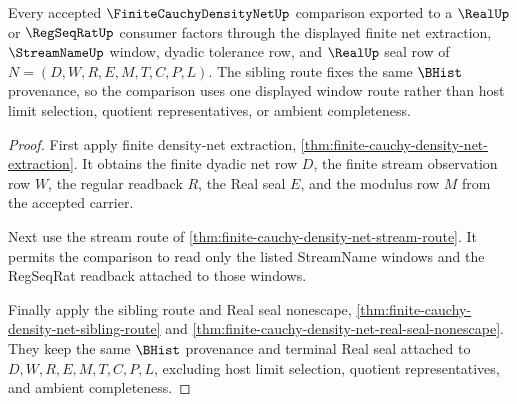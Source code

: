 \begin{theorem}
\label{thm:finite-cauchy-density-net-window-comparison}
Every accepted $\FiniteCauchyDensityNetUp$ comparison exported to a $\RealUp$ or $\RegSeqRatUp$ consumer factors through the displayed finite net extraction, $\StreamNameUp$ window, dyadic tolerance row, and $\RealUp$ seal row of $N=(D,W,R,E,M,T,C,P,L)$. The sibling route fixes the same $\BHist$ provenance, so the comparison uses one displayed window route rather than host limit selection, quotient representatives, or ambient completeness.
\end{theorem}
\begin{proof}
First apply finite density-net extraction, \autoref{thm:finite-cauchy-density-net-extraction}. It obtains the finite dyadic net row $D$, the finite stream observation row $W$, the regular readback $R$, the Real seal $E$, and the modulus row $M$ from the accepted carrier.

Next use the stream route of \autoref{thm:finite-cauchy-density-net-stream-route}. It permits the comparison to read only the listed StreamName windows and the RegSeqRat readback attached to those windows.

Finally apply the sibling route and Real seal nonescape, \autoref{thm:finite-cauchy-density-net-sibling-route} and \autoref{thm:finite-cauchy-density-net-real-seal-nonescape}. They keep the same $\BHist$ provenance and terminal Real seal attached to $D,W,R,E,M,T,C,P,L$, excluding host limit selection, quotient representatives, and ambient completeness.
\end{proof}


